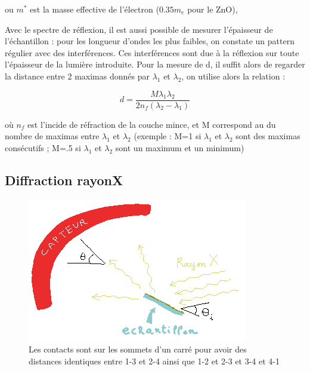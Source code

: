 \documentclass[a4paper,12pt,oneside]{article}
\def \be {\begin{equation}}
\def \ee {\end{equation}}
\begin{document}
ou $m^*$ est la masse effective de l'électron ($0.35 m_e$ pour le ZnO),





Avec le spectre de réflexion, il est aussi possible de mesurer l'épaisseur de l'échantillon : pour les longueur d'ondes les plus faibles, on constate un pattern régulier avec des interférences. Ces interférences sont due à la réflexion sur toute l'épaisseur de la lumière introduite. Pour la mesure de d, il suffit alors de regarder la distance entre 2 maximas donnés par $\lambda_1$ et $\lambda_2$, on utilise alors la relation :

\be
	d=\frac{M\lambda_1 \lambda_2}{2 n_f (\lambda_2 - \lambda_1)} \label{eq:refl}
\ee


où $n_f$ est l'incide de réfraction de la couche mince, et M correspond au du nombre de maximas entre $\lambda_1$ et $\lambda_2$ (exemple : M=1 si $\lambda_1$ et $\lambda_2$ sont des maximas consécutifs ; M=.5 si $\lambda_1$ et $\lambda_2$ sont un maximum et un minimum)





\subsection{Diffraction rayonX}

		\begin{figure}[h!]
			\begin{center}
			\includegraphics[width=0.8\linewidth,angle=0]{./figures/illustration_rayon_X.png}
			\caption{Les contacts sont sur les sommets d'un carré pour avoir des distances identiques entre 1-3 et 2-4 ainsi que 1-2 et 2-3 et 3-4 et 4-1} \label{fig:illustration_rayon_X}
			\end{center}
		\end{figure}
\end{document}
